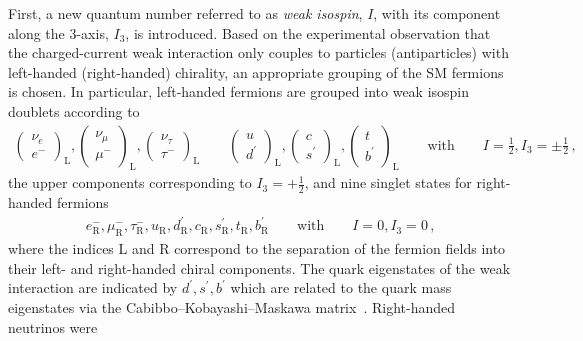 First, a new quantum number referred to as \emph{weak isospin}, $I$, with its
component along the 3-axis, $I_3$, is introduced. Based on the experimental
observation that the charged-current weak interaction only couples to particles
(antiparticles) with left-handed (right-handed) chirality, an appropriate
grouping of the SM fermions is chosen. In particular, left-handed fermions are
grouped into weak isospin doublets according to
\begin{align*}
  \begin{pmatrix}
    \nu_{e} \\
    e^{-}
  \end{pmatrix}_{\text{L}},
  \begin{pmatrix}
    \nu_{\mu} \\
    \mu^{-}
  \end{pmatrix}_{\text{L}},
  \begin{pmatrix}
    \nu_{\tau} \\
    \tau^{-}
  \end{pmatrix}_{\text{L}}
  \qquad
  \begin{pmatrix}
    u \\
    d^\prime
  \end{pmatrix}_{\text{L}},
  \begin{pmatrix}
    c \\
    s^\prime
  \end{pmatrix}_{\text{L}},
  \begin{pmatrix}
    t \\
    b^\prime
  \end{pmatrix}_{\text{L}}
  \qquad
  \text{with}
  \qquad
  I = \frac{1}{2}, I_3 = \pm \frac{1}{2} \,\text{,}
\end{align*}
the upper components corresponding to $I_3 = +\frac{1}{2}$, and nine singlet
states for right-handed fermions
\begin{align*}
  e^{-}_{\text{R}}, \mu^{-}_{\text{R}}, \tau^{-}_{\text{R}},
  u_{\text{R}}, d^\prime_{\text{R}}, c_{\text{R}}, s^\prime_{\text{R}}, t_{\text{R}}, b^\prime_{\text{R}}
  \qquad
  \text{with}
  \qquad
  I = 0, I_3 = 0 \,\text{,}
\end{align*}
where the indices L and R correspond to the separation of the fermion fields
into their left- and right-handed chiral components. The quark eigenstates of
the weak interaction are indicated by $d^\prime, s^\prime, b^\prime$ which are
related to the quark mass eigenstates via the Cabibbo--Kobayashi--Maskawa
matrix~\cite{Cabibbo:1963yz,Kobayashi:1973fv}. Right-handed neutrinos were

